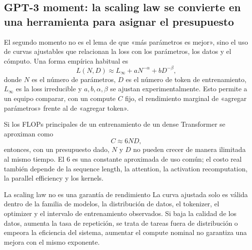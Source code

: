 
\subsection{GPT-3 moment: la scaling law se convierte en una herramienta para asignar el presupuesto}

El segundo momento no es el lema de que «más parámetros es mejor», sino el uso de curvas ajustables que relacionan la loss con los parámetros, los datos y el cómputo. Una forma empírica habitual es
\[
L(N,D)\approx L_\infty+aN^{-\alpha}+bD^{-\beta},
\]
donde $N$ es el número de parámetros, $D$ es el número de token de entrenamiento, $L_\infty$ es la loss irreducible y $a,b,\alpha,\beta$ se ajustan experimentalmente. Esto permite a un equipo comparar, con un compute $C$ fijo, el rendimiento marginal de «agregar parámetros» frente al de «agregar token».


Si los FLOPs principales de un entrenamiento de un dense Transformer se aproximan como
\[
C\approx 6ND,
\]
entonces, con un presupuesto dado, $N$ y $D$ no pueden crecer de manera ilimitada al mismo tiempo. El $6$ es una constante aproximada de uso común; el costo real también depende de la sequence length, la attention, la activation recomputation, la parallel efficiency y los kernels.

\begin{warningbox}{La scaling law no es una garantía de rendimiento}
La curva ajustada solo es válida dentro de la familia de modelos, la distribución de datos, el tokenizer, el optimizer y el intervalo de entrenamiento observados. Si baja la calidad de los datos, aumenta la tasa de repetición, se trata de tareas fuera de distribución o empeora la eficiencia del sistema, aumentar el compute nominal no garantiza una mejora con el mismo exponente.
\end{warningbox}



